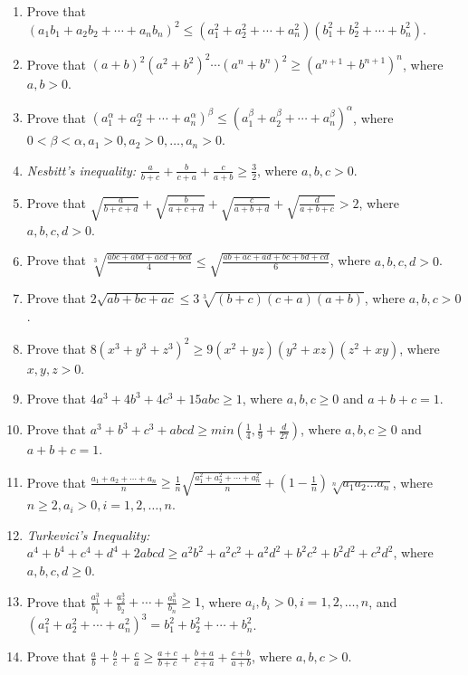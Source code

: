 \begin{enumerate}
\item Prove that $(a_1b_1 + a_2b_2 + \cdots + a_nb_n)^2\leq (a_1^2 + a_2^2 + \cdots + a_n^2)(b_1^2 + b_2^2 + \cdots + b_n^2)$.
\item Prove that $(a + b)^2(a^2 + b^2)^2\cdots(a^n + b^n)^2\geq (a^{n + 1} + b^{n + 1})^n$, where $a, b > 0$.
\item Prove that $(a_1^\alpha + a_2^\alpha + \cdots + a_n^\alpha)^\beta\leq(a_1^\beta + a_2^\beta + \cdots + a_n^\beta)^\alpha$,
  where $0 < \beta < \alpha, a_1 > 0, a_2 > 0, \ldots, a_n > 0$.
\item \textit{Nesbitt's inequality:} $\frac{a}{b + c} + \frac{b}{c + a} + \frac{c}{a + b}\geq \frac{3}{2}$, where $a, b, c > 0$.
\item Prove that $\sqrt{\frac{a}{b + c + d}} + \sqrt{\frac{b}{a + c + d}} + \sqrt{\frac{c}{a + b + d}} + \sqrt{\frac{d}{a + b + c}}
  > 2$, where $a, b, c, d > 0$.
\item Prove that $\sqrt[3]{\frac{abc + abd + acd + bcd}{4}}\leq \sqrt{\frac{ab + ac + ad + bc + bd + cd}{6}}$, where $a, b, c, d >
  0$.
\item Prove that $2\sqrt{ab + bc + ac}\leq 3\sqrt[3]{(b + c)(c + a)(a + b)}$, where $a, b, c > 0$.
\item Prove that $8(x^3 + y^3 + z^3)^2 \geq 9(x^2 + yz)(y^2 + xz)(z^2 + xy)$, where $x, y, z > 0$.
\item Prove that $4a^3 + 4b^3 + 4c^3 + 15abc\geq 1$, where $a, b, c\geq 0$ and $a + b + c = 1$.
\item Prove that $a^3 + b^3 + c^3 + abcd \geq min\left(\frac{1}{4}, \frac{1}{9} + \frac{d}{27}\right)$, where $a, b, c\geq 0$ and
  $a + b + c = 1$.
\item Prove that $\frac{a_1 + a_2 + \cdots + a_n}{n}\geq \frac{1}{n}\sqrt{\frac{a_1^2 + a_2^2 + \cdots + a_n^2}{n}} + \left(1 -
  \frac{1}{n}\right)\sqrt[n]{a_1a_2\ldots a_n}$, where $n\geq 2, a_i > 0, i = 1, 2, \ldots, n$.
\item \textit{Turkevici's Inequality:} $a^4 + b^4 + c^4 + d^4 + 2abcd \geq a^2b^2 + a^2c^2 + a^2d^2 + b^2c^2 + b^2d^2 + c^2d^2$,
  where $a, b, c, d\geq 0$.
\item Prove that $\frac{a_1^3}{b_1} + \frac{a_2^3}{b_2} + \cdots + \frac{a_n^3}{b_n}\geq 1$, where $a_i, b_i > 0, i = 1, 2, \ldots,
  n$, and $(a_1^2 + a_2^2 + \cdots + a_n^2)^3 = b_1^2 + b_2^2 + \cdots + b_n^2$.
\item Prove that $\frac{a}{b} + \frac{b}{c} + \frac{c}{a}\geq \frac{a + c}{b + c} + \frac{b + a}{c + a} + \frac{c + b}{a + b}$,
  where $a, b, c > 0$.

\end{enumerate}

